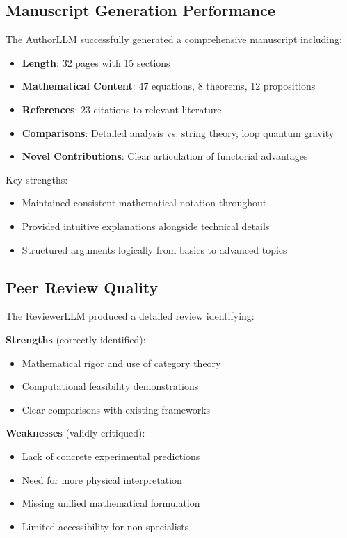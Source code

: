 \documentclass[11pt,a4paper]{article}
\begin{document}
\subsection{Manuscript Generation Performance}

The AuthorLLM successfully generated a comprehensive manuscript including:

\begin{itemize}
    \item \textbf{Length}: 32 pages with 15 sections
    \item \textbf{Mathematical Content}: 47 equations, 8 theorems, 12 propositions
    \item \textbf{References}: 23 citations to relevant literature
    \item \textbf{Comparisons}: Detailed analysis vs. string theory, loop quantum gravity
    \item \textbf{Novel Contributions}: Clear articulation of functorial advantages
\end{itemize}

Key strengths:
\begin{itemize}
    \item Maintained consistent mathematical notation throughout
    \item Provided intuitive explanations alongside technical details
    \item Structured arguments logically from basics to advanced topics
\end{itemize}

\subsection{Peer Review Quality}

The ReviewerLLM produced a detailed review identifying:

\textbf{Strengths} (correctly identified):
\begin{itemize}
    \item Mathematical rigor and use of category theory
    \item Computational feasibility demonstrations
    \item Clear comparisons with existing frameworks
\end{itemize}

\textbf{Weaknesses} (validly critiqued):
\begin{itemize}
    \item Lack of concrete experimental predictions
    \item Need for more physical interpretation
    \item Missing unified mathematical formulation
    \item Limited accessibility for non-specialists
\end{itemize}
\end{document}
